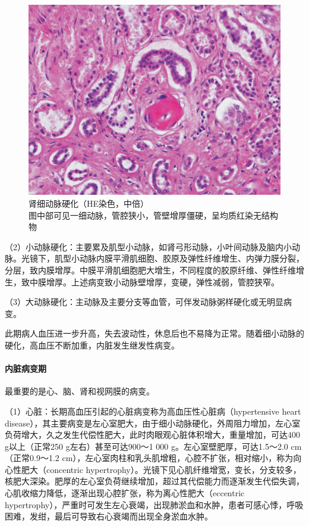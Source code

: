 \begin{figure}[!htbp]
    \centering
    \includegraphics{./images/Image00099.jpg}
    \captionsetup{justification=centering}
    \caption{肾细动脉硬化（HE染色，中倍）\\{\small 图中部可见一细动脉，管腔狭小，管壁增厚僵硬，呈均质红染无结构物}}
    \label{fig6-7}
\end{figure}



（2）小动脉硬化：主要累及肌型小动脉，如肾弓形动脉，小叶间动脉及脑内小动脉。光镜下，肌型小动脉内膜平滑肌细胞、胶原及弹性纤维增生、内弹力膜分裂，分层，致内膜增厚。中膜平滑肌细胞肥大增生，不同程度的胶原纤维、弹性纤维增生，致中膜增厚。上述病变致小动脉壁增厚，变硬，弹性减弱，管腔狭窄。

（3）大动脉硬化：主动脉及主要分支等血管，可伴发动脉粥样硬化或无明显病变。

此期病人血压进一步升高，失去波动性，休息后也不易降为正常。随着细小动脉的硬化，高血压不断加重，内脏发生继发性病变。

\paragraph{内脏病变期}
最重要的是心、脑、肾和视网膜的病变。

（1）心脏：长期高血压引起的心脏病变称为高血压性心脏病（hypertensive
heart
disease），其主要病变是左心室肥大，由于细小动脉硬化，外周阻力增加，左心室负荷增大，久之发生代偿性肥大，此时肉眼观心脏体积增大，重量增加，可达400
g以上（正常250 g左右）甚至可达900～1 000 g。左心室壁肥厚，可达1.5～2.0
cm（正常0.9～1.2
cm），左心室肉柱和乳头肌增粗，心腔不扩张，相对缩小，称为向心性肥大（concentric
hypertrophy）。光镜下见心肌纤维增宽，变长，分支较多，核肥大深染。肥厚的左心室负荷继续增加，超过其代偿能力而逐渐发生代偿失调，心肌收缩力降低，逐渐出现心腔扩张，称为离心性肥大（eccentric
hypertrophy），严重时可发生左心衰竭，出现肺淤血和水肿，患者可感心悸，呼吸困难，发绀，最后可导致右心衰竭而出现全身淤血水肿。


